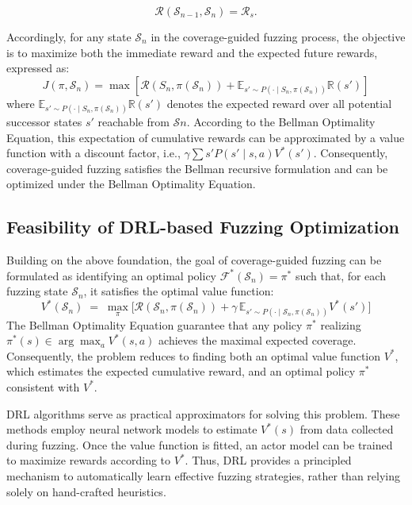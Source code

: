 \documentclass[lettersize,journal]{IEEEtran}
\begin{document}
\begin{equation}
	\mathcal{R}(\mathcal{S}_{n-1}, \mathcal{S}_{n}) = \mathcal{R}_{s}.
\end{equation}

Accordingly, for any state $\mathcal{S}_{n}$ in the coverage-guided fuzzing process, the objective is to maximize both the immediate reward and the expected future rewards, expressed as:
\begin{equation}
	J(\pi, \mathcal{S}_{n}) = \max\left[\mathcal{R}\left(S_n, \pi(\mathcal{S}_{n})\right) + \mathbb{E}_{s'\sim P(\cdot\mid S_n, \pi(\mathcal{S}_{n}))} \mathbb{R}(s')\right]
\end{equation}
where $\mathbb{E}_{s'\sim P(\cdot\mid S_n, \pi(\mathcal{S}_{n}))} \mathbb{R}(s')$ denotes the expected reward over all potential successor states $s'$ reachable from $\mathcal{S}{n}$. According to the Bellman Optimality Equation, this expectation of cumulative rewards can be approximated by a value function with a discount factor, i.e., $\gamma \sum{s'} P(s' \mid s,a)V^*(s')$. Consequently, coverage-guided fuzzing satisfies the Bellman recursive formulation and can be optimized under the Bellman Optimality Equation.

\subsection{Feasibility of DRL-based Fuzzing Optimization}
Building on the above foundation, the goal of coverage-guided fuzzing can be formulated as identifying an optimal policy $\mathcal{F}^*(\mathcal{S}_{n})=\pi^*$ such that, for each fuzzing state $\mathcal{S}_{n}$, it satisfies the optimal value function:
\begin{equation}
		V^*(\mathcal{S}_{n})\;=\;\max_{\pi} \Big[\mathcal{R}(\mathcal{S}_{n},\pi(\mathcal{S}_{n}))+\gamma\,\mathbb{E}_{s'\sim P(\cdot\mid \mathcal{S}_{n},\pi(\mathcal{S}_{n}))} V^*(s')\Big]
\end{equation}
The Bellman Optimality Equation guarantee that any policy $\pi^*$ realizing $\pi^*(s)\in\arg\max_a V^*(s,a)$ achieves the maximal expected coverage. Consequently, the problem reduces to finding both an optimal value function $V^*$, which estimates the expected cumulative reward, and an optimal policy $\pi^*$ consistent with $V^*$.

DRL algorithms serve as practical approximators for solving this problem. These methods employ neural network models to estimate $V^*(s)$ from data collected during fuzzing. Once the value function is fitted, an actor model can be trained to maximize rewards according to $V^*$. Thus, DRL provides a principled mechanism to automatically learn effective fuzzing strategies, rather than relying solely on hand-crafted heuristics.
\end{document}

